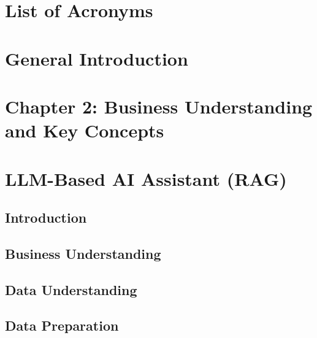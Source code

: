 \documentclass[12pt]{report}
\begin{document}
\chapter*{List of Acronyms}


\newpage

\chapter*{General Introduction}


\newpage

\setcounter{chapter}{2}  %
\setcounter{section}{0}
\chapter*{Chapter 2: Business Understanding and Key Concepts}




\newpage




\setcounter{chapter}{4} 
\chapter{LLM-Based AI Assistant (RAG)} %
\label{chap:llm-rag}

\section*{Introduction}

\pagebreak  %



\section{Business Understanding} %

\section{Data Understanding} %

\section{Data Preparation} %

\end{document}
